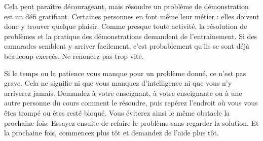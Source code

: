 \documentclass[../../../include/open-logic-section]{subfiles}
\begin{document}
Cela peut paraître décourageant,
mais résoudre un problème de
démonstration est un défi
gratifiant. Certaines personnes
en font même leur métier :
elles doivent donc y trouver
quelque plaisir. Comme presque
toute activité, la résolution
de problèmes et la pratique
des démonstrations demandent
de l'entraînement. Si des
camarades semblent y arriver
facilement, c'est probablement
qu'ils se sont déjà beaucoup
exercés. Ne renoncez pas trop vite.

Si le temps ou la patience vous
manque pour un problème donné,
ce n'est pas grave. Cela ne
signifie ni que vous manquez
d'intelligence ni que vous
n'y arriverez jamais. Demandez
à votre enseignant, à votre
enseignante ou à une autre
personne du cours comment le résoudre,
puis repérez l'endroit où
vous vous êtes trompé ou
êtes resté bloqué. Vous
éviterez ainsi le même
obstacle la prochaine fois.
Essayez ensuite de refaire
le problème sans regarder
la solution. Et la prochaine
fois, commencez plus tôt
et demandez de l'aide
plus tôt.
\end{document}
